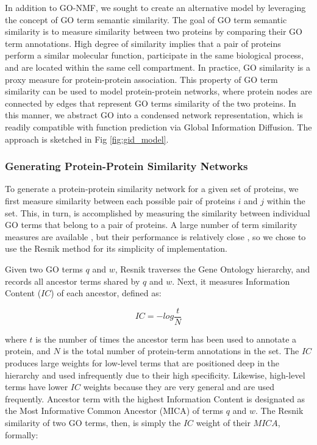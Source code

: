 \documentclass[12pt,a4paper]{report}
\begin{document}
In addition to GO-NMF, we sought to create an alternative model by leveraging the concept of GO term semantic similarity. The goal of GO term semantic similarity is to measure similarity between two proteins by comparing their GO term annotations. High degree of similarity implies that a pair of proteins perform a similar molecular function, participate in the same biological process, and are located within the same cell compartment. In practice, GO similarity is a proxy measure for protein-protein association. This property of GO term similarity can be used to model protein-protein networks, where protein nodes are connected by edges that represent GO terms similarity of the two proteins. In this manner, we  abstract GO into a condensed network representation, which is readily compatible with function prediction via Global Information Diffusion. The approach is sketched in Fig \ref{fig:gid_model}.

\subsubsection{Generating Protein-Protein Similarity Networks}

To generate a protein-protein similarity network for a given set of proteins, we first measure similarity between each possible pair of proteins $i$ and $j$ within the set. This, in turn, is accomplished by measuring the similarity between individual GO terms that belong to a pair of proteins. A large number of term similarity measures are available \cite{semantic_review}, but their performance is relatively close \cite{Pesquita2008_sim_eval}, so we chose to use the Resnik method \cite{resnik} for its simplicity of implementation.

Given two GO terms $q$ and $w$, Resnik traverses the Gene Ontology hierarchy, and records all ancestor terms shared by $q$ and $w$. Next, it measures Information Content ($IC$) of each ancestor, defined as:

\begin{equation*} \label{eq:resnik_equation}
IC = -log \frac{t}{N}
\tag{12}
\end{equation*}

where $t$ is the number of times the ancestor term has been used to annotate a protein, and $N$ is the total number of protein-term annotations in the set. The $IC$ produces large weights for low-level terms that are positioned deep in the hierarchy and used infrequently due to their high specificity. Likewise, high-level terms have lower $IC$ weights because they are very general and are used frequently. Ancestor term with the highest Information Content is designated as the Most Informative Common Ancestor (MICA) of terms $q$ and $w$. The Resnik similarity of two GO terms, then, is simply the $IC$ weight of their $MICA$, formally:
\end{document}
